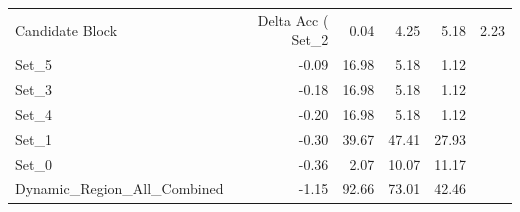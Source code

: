 \begin{tabular}{lrrrr}
\toprule
Candidate Block & Delta Acc (%
\midrule
Set_2 & 0.04 & 4.25 & 5.18 & 2.23 \\
Set_5 & -0.09 & 16.98 & 5.18 & 1.12 \\
Set_3 & -0.18 & 16.98 & 5.18 & 1.12 \\
Set_4 & -0.20 & 16.98 & 5.18 & 1.12 \\
Set_1 & -0.30 & 39.67 & 47.41 & 27.93 \\
Set_0 & -0.36 & 2.07 & 10.07 & 11.17 \\
Dynamic_Region_All_Combined & -1.15 & 92.66 & 73.01 & 42.46 \\
\bottomrule
\end{tabular}

